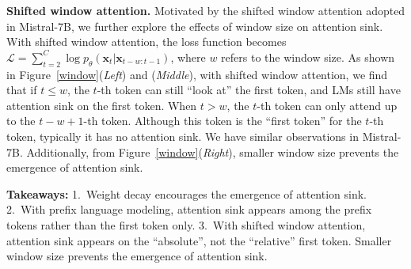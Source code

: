 \textbf{Shifted window attention.} Motivated by the shifted window attention adopted in Mistral-7B, we further explore the effects of window size on attention sink. With shifted window attention, the loss function becomes $\mathcal{L}=\sum_{t=2}^C\log p_{\theta}(\boldsymbol{x}_t|\boldsymbol{x}_{t-w:t-1})$, where $w$ refers to the window size. As shown in Figure~\ref{window}(\emph{Left}) and (\emph{Middle}), with shifted window attention, we find that if $t\leq w$, the $t$-th token can still ``look at'' the first token, and LMs still have attention sink on the first token. When $t>w$, the $t$-th token can only attend up to the $t-w+1$-th token. Although this token is the ``first token'' for the $t$-th token, typically it has no attention sink. We have similar observations in Mistral-7B. Additionally, from Figure~\ref{window}(\emph{Right}), smaller window size prevents the emergence of attention sink.

\vspace{-0.1cm}
\begin{abox} %
     \textbf{Takeaways:} 1.~Weight decay encourages the emergence of attention sink. 2.~With prefix language modeling, attention sink appears among the prefix tokens rather than the first token only. 3.~With shifted window attention, attention sink appears on the ``absolute'', not the  ``relative'' first token. Smaller window size prevents the emergence of attention sink.
\end{abox}





